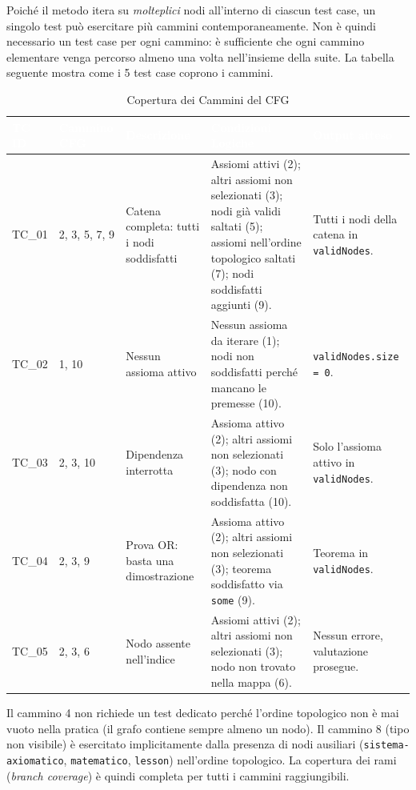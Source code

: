 \documentclass[12pt,a4paper]{article}
\begin{document}
Poiché il metodo itera su \textit{molteplici} nodi all'interno di ciascun test case, un singolo test può esercitare più cammini contemporaneamente. Non è quindi necessario un test case per ogni cammino: è sufficiente che ogni cammino elementare venga percorso almeno una volta nell'insieme della suite. La tabella seguente mostra come i 5 test case coprono i cammini.

\begin{table}[H]
    \centering
    \footnotesize
    \begin{tabularx}{\textwidth}{|p{1cm}|p{2.5cm}|p{2.5cm}|X|X|}
        \hline
        \rowcolor{PrimaryBlue} \textcolor{white}{\textbf{TC ID}} & \textcolor{white}{\textbf{Cammino CFG}} & \textcolor{white}{\textbf{Descrizione}} & \textcolor{white}{\textbf{Condizioni Logiche}} & \textcolor{white}{\textbf{Output atteso}} \\
        \hline
        TC\_01 & 2, 3, 5, 7, 9 & Catena completa: tutti i nodi soddisfatti & Assiomi attivi (2); altri assiomi non selezionati (3); nodi già validi saltati (5); assiomi nell'ordine topologico saltati (7); nodi soddisfatti aggiunti (9). & Tutti i nodi della catena in \texttt{validNodes}. \\
        \hline
        \rowcolor{CodeBg} TC\_02 & 1, 10 & Nessun assioma attivo & Nessun assioma da iterare (1); nodi non soddisfatti perché mancano le premesse (10). & \texttt{validNodes.size = 0}. \\
        \hline
        TC\_03 & 2, 3, 10 & Dipendenza interrotta & Assioma attivo (2); altri assiomi non selezionati (3); nodo con dipendenza non soddisfatta (10). & Solo l'assioma attivo in \texttt{validNodes}. \\
        \hline
        \rowcolor{CodeBg} TC\_04 & 2, 3, 9 & Prova OR: basta una dimostrazione & Assioma attivo (2); altri assiomi non selezionati (3); teorema soddisfatto via \texttt{some} (9). & Teorema in \texttt{validNodes}. \\
        \hline
        TC\_05 & 2, 3, 6 & Nodo assente nell'indice & Assiomi attivi (2); altri assiomi non selezionati (3); nodo non trovato nella mappa (6). & Nessun errore, valutazione prosegue. \\
        \hline
    \end{tabularx}
    \caption{Copertura dei Cammini del CFG}
\end{table}

Il cammino 4 non richiede un test dedicato perché l'ordine topologico non è mai vuoto nella pratica (il grafo contiene sempre almeno un nodo). Il cammino 8 (tipo non visibile) è esercitato implicitamente dalla presenza di nodi ausiliari (\texttt{sistema-axiomatico}, \texttt{matematico}, \texttt{lesson}) nell'ordine topologico. La copertura dei rami (\textit{branch coverage}) è quindi completa per tutti i cammini raggiungibili.
\end{document}
